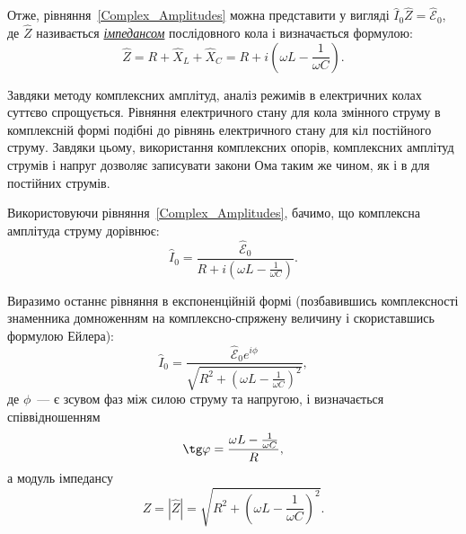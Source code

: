 Отже, рівняння~\eqref{Complex_Amplitudes} можна представити у вигляді  $\hat{I}_0 \hat{Z} = \hat{\mathcal{E}}_0$, де $\hat{Z}$ називається \href{http://femto.com.ua/articles/part_1/1313.html}{\emph{імпедансом}} послідовного кола і визначається формулою:
\begin{equation}\label{total_impedance}
	\hat{Z} = R + \hat{X}_L + \hat{X}_C = R  +   i\left(  \omega L - \frac{1}{\omega C} \right) .
\end{equation}

\begin{More}

	Завдяки методу комплексних амплітуд, аналіз режимів в електричних колах суттєво спрощується. Рівняння електричного стану для кола змінного струму в комплексній формі подібні до рівнянь електричного стану для кіл постійного струму. Завдяки цьому, використання комплексних опорів, комплексних амплітуд струмів і напруг дозволяє записувати закони Ома таким же чином, як і в для постійних струмів.
\end{More}

Використовуючи рівняння~\eqref{Complex_Amplitudes}, бачимо, що комплексна амплітуда струму дорівнює:
\begin{equation}\label{CI0}
	\hat{I}_0 = \frac{\hat{\mathcal{E}}_0}{R  +   i\left(  \omega L - \frac{1}{\omega C} \right)}.
\end{equation}

Виразимо останнє рівняння в експоненційній формі (позбавившись комплексності знаменника домноженням на комплексно-спряжену величину і скориставшись формулою Ейлера):
\begin{equation}\label{CI0_phase}
	\hat{I}_0 = \frac{\hat{\mathcal{E}}_0e^{i\phi}}{\sqrt{R^2  +   \left(  \omega L - \frac{1}{\omega C} \right)^2}},
\end{equation}
де $\phi$~--- є зсувом фаз між силою струму та напругою, і визначається співвідношенням
\begin{equation}\label{S-phase_shift}
	\tg\phi = \frac{\omega L - \frac{1}{\omega C}}{R},
\end{equation}
а модуль імпедансу
\begin{equation}
	Z = |\hat{Z}| = \sqrt{R^2  +   \left(  \omega L - \frac{1}{\omega C} \right)^2}.
\end{equation}

